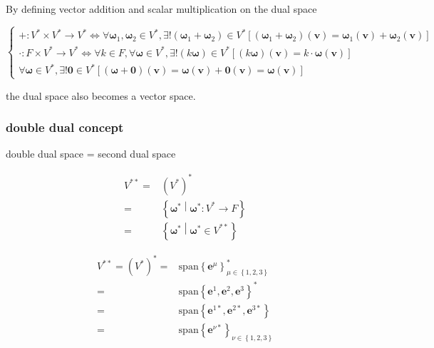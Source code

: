 \documentclass[
]{book}
\theoremstyle{definition}
\theoremstyle{definition}
\theoremstyle{definition}
\theoremstyle{definition}
\theoremstyle{remark}
\begin{document}
By defining vector addition and scalar multiplication on the dual space

\[
\begin{cases}
+:V^{*}\times V^{*}\rightarrow V^{*}\Leftrightarrow\forall\boldsymbol{\omega}_{{\scriptscriptstyle 1}},\boldsymbol{\omega}_{{\scriptscriptstyle 2}}\in V^{*},\exists!\left(\boldsymbol{\omega}_{{\scriptscriptstyle 1}}+\boldsymbol{\omega}_{{\scriptscriptstyle 2}}\right)\in V^{*}\left[\left(\boldsymbol{\omega}_{{\scriptscriptstyle 1}}+\boldsymbol{\omega}_{{\scriptscriptstyle 2}}\right)\left(\boldsymbol{v}\right)=\boldsymbol{\omega}_{{\scriptscriptstyle 1}}\left(\boldsymbol{v}\right)+\boldsymbol{\omega}_{{\scriptscriptstyle 2}}\left(\boldsymbol{v}\right)\right]\\
\cdot:F\times V^{*}\rightarrow V^{*}\Leftrightarrow\forall k\in F,\forall\boldsymbol{\omega}\in V^{*},\exists!\left(k\boldsymbol{\omega}\right)\in V^{*}\left[\left(k\boldsymbol{\omega}\right)\left(\boldsymbol{v}\right)=k\cdot\boldsymbol{\omega}\left(\boldsymbol{v}\right)\right]\\
\forall\boldsymbol{\omega}\in V^{*},\exists!\boldsymbol{0}\in V^{*}\left[\left(\boldsymbol{\omega}+\boldsymbol{0}\right)\left(\boldsymbol{v}\right)=\boldsymbol{\omega}\left(\boldsymbol{v}\right)+\boldsymbol{0}\left(\boldsymbol{v}\right)=\boldsymbol{\omega}\left(\boldsymbol{v}\right)\right]
\end{cases}
\]

the dual space also becomes a vector space.

\hypertarget{double-dual-concept}{%
\subsubsection{double dual concept}\label{double-dual-concept}}

double dual space = second dual space

\[
\begin{aligned}
V^{**}= & \left(V^{*}\right)^{*}\\
= & \left\{ \boldsymbol{\omega}^{*}\middle|\boldsymbol{\omega}^{*}:V^{*}\rightarrow F\right\} \\
= & \left\{ \boldsymbol{\omega}^{*}\middle|\boldsymbol{\omega}^{*}\in V^{**}\right\} 
\end{aligned}
\]

\[
\begin{aligned}
V^{**}=\left(V^{*}\right)^{*}= & \mathrm{span}\left\{ \boldsymbol{e}^{{\scriptscriptstyle \mu}}\right\} _{{\scriptscriptstyle \mu\in\left\{ 1,2,3\right\} }}^{*}\\
= & \mathrm{span}\left\{ \boldsymbol{e}^{{\scriptscriptstyle 1}},\boldsymbol{e}^{{\scriptscriptstyle 2}},\boldsymbol{e}^{{\scriptscriptstyle 3}}\right\} ^{*}\\
= & \mathrm{span}\left\{ \boldsymbol{e}^{{\scriptscriptstyle 1}*},\boldsymbol{e}^{{\scriptscriptstyle 2}*},\boldsymbol{e}^{{\scriptscriptstyle 3}*}\right\} \\
= & \mathrm{span}\left\{ \boldsymbol{e}^{{\scriptscriptstyle \nu}*}\right\} _{{\scriptscriptstyle \nu\in\left\{ 1,2,3\right\} }}
\end{aligned}
\]
\end{document}
